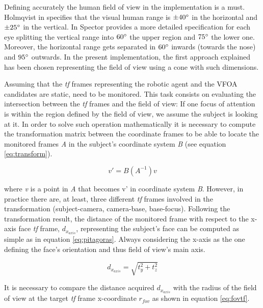 \documentclass{sig-alternate}
\begin{document}
Defining accurately the human field of view in the implementation is a must. Holmqvist in \cite{holmqvist2011eye} specifies that the visual human range is $ \pm  40\degree $ in the horizontal and $ \pm 25\degree $ in the vertical. In \cite{walker1980clinical} Spector provides a more detailed specification for each eye splitting the vertical range into $ 60\degree $ the upper region and $ 75\degree $ the lower one. Moreover, the horizontal range gets separated in $ 60\degree $ inwards (towards the nose) and $ 95\degree $ outwards. In the present implementation, the first approach explained has been chosen representing the field of view using a cone with such dimensions.

Assuming that the \textit{tf} frames representing the robotic agent and the VFOA candidates are static, need to be monitored. This task consists on evaluating the intersection between the \textit{tf} frames and the field of view: If one focus of attention is within the region defined by the field of view, we assume the subject is looking at it. In order to solve such operation mathematically it is necessary to compute the transformation matrix between the coordinate frames to be able to locate the monitored frames \textit{A} in the subject's coordinate system \textit{B} (see equation \ref{eq:transform}).

\begin{equation}
v' = B(A^{-1})v
\label{eq:transform}
\end{equation}

where \textit{v} is a point in \textit{A} that becomes v' in coordinate system \textit{B}. However, in practice there are, at least, three different \textit{tf} frames involved in the transformation (subject-camera, camera-base, base-focus). Following the transformation result, the distance of the monitored frame with respect to the x-axis face \textit{tf} frame, $ d_{x_{axis}} $, representing the subject's face can be computed as simple as in equation \ref{eq:pitagoras}. Always considering the x-axis as the one defining the face's orientation and thus field of view's main axis.

\begin{equation}
d_{x_{axis}} = \sqrt{t_y^2 + t_z^2}
\label{eq:pitagoras}
\end{equation}

It is necessary to compare the distance acquired $ d_{x_{axis}} $ with the radius of the field of view at the target \textit{tf} frame x-coordinate $ r_{fov} $ as shown in equation \ref{eq:fovtf}.
\end{document}
